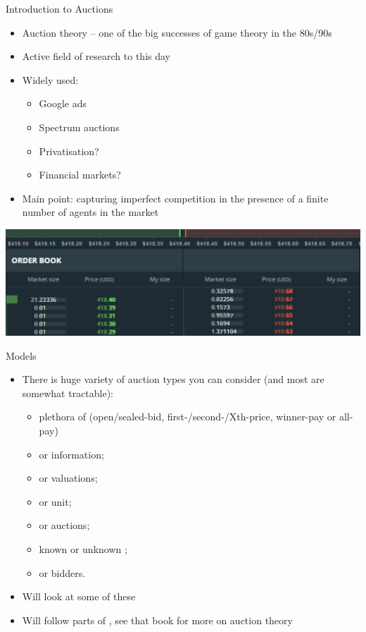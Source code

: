 \documentclass[english,10pt
,aspectratio=169
]{beamer}
\begin{document}
\begin{frame}{Introduction to Auctions}
	\begin{itemize}
		\item Auction theory -- one of the big successes of game theory in the 80s/90s
		\item Active field of research to this day
		\item Widely used:
		\begin{itemize}
			\item Google ads
			\item Spectrum auctions
			\item Privatisation?
			\item Financial markets?
		\end{itemize}
		\item Main point: capturing imperfect competition in the presence of a finite number of agents in the market
	\end{itemize}
\end{frame}


\begin{frame}
	\center
	\includegraphics[width=\linewidth]{pics/LOB}
\end{frame}


\begin{frame}{Models}
	\begin{itemize}
		\item There is huge variety of auction types you can consider (and most are somewhat tractable):
		\begin{itemize}
			\item plethora of  (open/sealed-bid, first-/second-/Xth-price, winner-pay or all-pay)
			\item {} or  information;
			\item {} or  valuations;
			\item {} or  unit;
			\item {} or  auctions;
			\item known or unknown ;
			\item {} or  bidders.
		\end{itemize}
		\pause
		\item Will look at some of these
		\item Will follow parts of \cite{krishna_auction_2009}, see that book for more on auction theory
	\end{itemize}
\end{frame}
\end{document}
